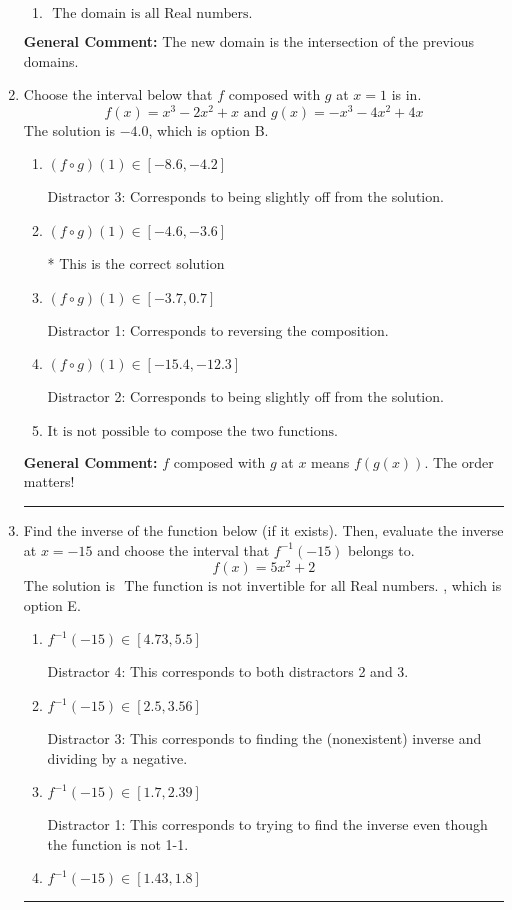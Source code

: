 \documentclass{extbook}[14pt]
\newcommand{\litem}[1]{\item #1

\rule{\textwidth}{0.4pt}}
\begin{document}
\begin{enumerate}
{\begin{enumerate}[label=\Alph*.]
\item \( \text{ The domain is all Real numbers. } \)


\end{enumerate}

\textbf{General Comment:} The new domain is the intersection of the previous domains.
}
\litem{
Choose the interval below that $f$ composed with $g$ at $x=1$ is in.
\[ f(x) = x^{3} -2 x^{2} +x \text{ and } g(x) = -x^{3} -4 x^{2} +4 x \]
The solution is \( -4.0 \), which is option B.\begin{enumerate}[label=\Alph*.]
\item \( (f \circ g)(1) \in [-8.6, -4.2] \)

 Distractor 3: Corresponds to being slightly off from the solution.
\item \( (f \circ g)(1) \in [-4.6, -3.6] \)

* This is the correct solution
\item \( (f \circ g)(1) \in [-3.7, 0.7] \)

 Distractor 1: Corresponds to reversing the composition.
\item \( (f \circ g)(1) \in [-15.4, -12.3] \)

 Distractor 2: Corresponds to being slightly off from the solution.
\item \( \text{It is not possible to compose the two functions.} \)


\end{enumerate}

\textbf{General Comment:} $f$ composed with $g$ at $x$ means $f(g(x))$. The order matters!
}
\litem{
Find the inverse of the function below (if it exists). Then, evaluate the inverse at $x = -15$ and choose the interval that $f^{-1}(-15)$ belongs to.
\[ f(x) = 5 x^2 + 2 \]
The solution is \( \text{ The function is not invertible for all Real numbers. } \), which is option E.\begin{enumerate}[label=\Alph*.]
\item \( f^{-1}(-15) \in [4.73, 5.5] \)

 Distractor 4: This corresponds to both distractors 2 and 3.
\item \( f^{-1}(-15) \in [2.5, 3.56] \)

 Distractor 3: This corresponds to finding the (nonexistent) inverse and dividing by a negative.
\item \( f^{-1}(-15) \in [1.7, 2.39] \)

 Distractor 1: This corresponds to trying to find the inverse even though the function is not 1-1. 
\item \( f^{-1}(-15) \in [1.43, 1.8] \)


\end{enumerate}}
\end{enumerate}
\end{document}
